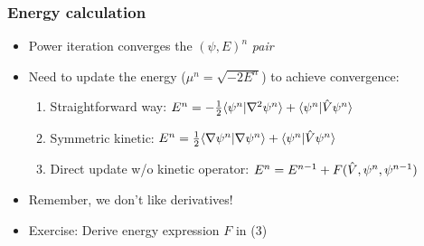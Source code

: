 \begin{frame}
    \frametitle{Energy calculation}
    \begin{itemize}
        \item Power iteration converges the $(\psi, E)^n$ \emph{pair}
        \vspace{4mm}
        \item Need to update the energy ($\mu^n = \sqrt{-2E^n}$) to achieve convergence:
        \vspace{4mm}
        \begin{enumerate}
            \item Straightforward way:
                $E^n = -\frac{1}{2} \langle \psi^n|\nabla^2 \psi^n \rangle + \langle \psi^n|\hat{V} \psi^n \rangle$
            \vspace{2mm}
            \item Symmetric kinetic:
                $E^n = \frac{1}{2} \langle \nabla \psi^n|\nabla \psi^n \rangle + \langle \psi^n|\hat{V} \psi^n \rangle$
            \vspace{2mm}
            \item Direct update w/o kinetic operator:
                $E^n = E^{n-1} + F(\hat{V}, \psi^n, \psi^{n-1})$
        \end{enumerate}
        \vspace{4mm}
        \item Remember, we don't like derivatives!
        \vspace{4mm}
        \item Exercise: Derive energy expression $F$ in (3)
    \end{itemize}
\end{frame}

